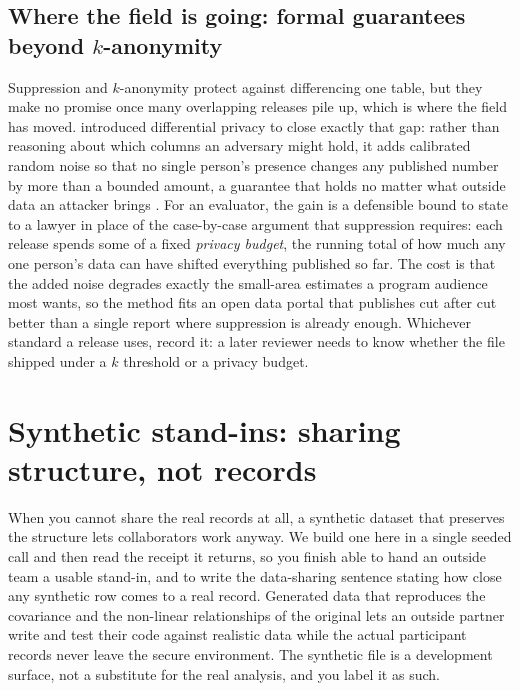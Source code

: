 \subsection{Where the field is going: formal guarantees beyond \texorpdfstring{$k$}{k}-anonymity}\label{sec:frontier-dp}
Suppression and $k$-anonymity protect against differencing one table, but they make no promise once many overlapping releases pile up, which is where the field has moved. \textcite{dwork2006diffpriv} introduced differential privacy to close exactly that gap: rather than reasoning about which columns an adversary might hold, it adds calibrated random noise so that no single person's presence changes any published number by more than a bounded amount, a guarantee that holds no matter what outside data an attacker brings \parencite{dworkroth2014found}.  For an evaluator, the gain is a defensible bound to state to a lawyer in place of the case-by-case argument that suppression requires: each release spends some of a fixed \emph{privacy budget}, the running total of how much any one person's data can have shifted everything published so far. The cost is that the added noise degrades exactly the small-area estimates a program audience most wants, so the method fits an open data portal that publishes cut after cut better than a single report where suppression is already enough. Whichever standard a release uses, record it: a later reviewer needs to know whether the file shipped under a $k$ threshold or a privacy budget.

\section{Synthetic stand-ins: sharing structure, not records}\label{sec:synth}
When you cannot share the real records at all, a synthetic dataset that preserves the structure lets collaborators work anyway. We build one here in a single seeded call and then read the receipt it returns, so you finish able to hand an outside team a usable stand-in, and to write the data-sharing sentence stating how close any synthetic row comes to a real record. Generated data that reproduces the covariance and the non-linear relationships of the original lets an outside partner write and test their code against realistic data while the actual participant records never leave the secure environment. The synthetic file is a development surface, not a substitute for the real analysis, and you label it as such.

